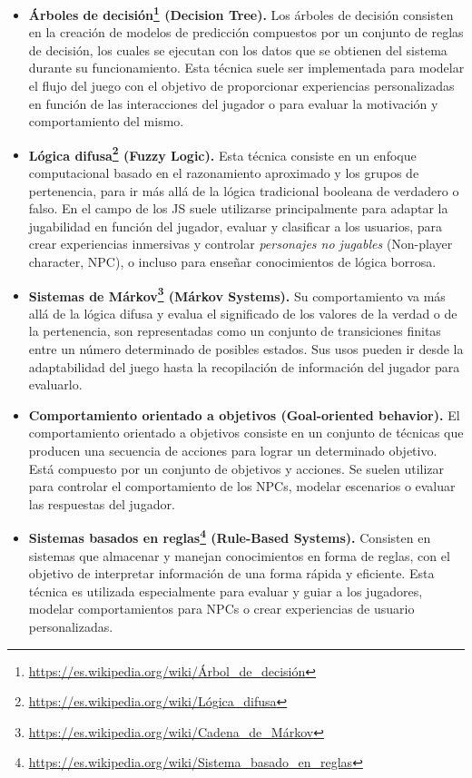 \begin{itemize}
	\item \textbf{Árboles de decisión\footnote{\url{https://es.wikipedia.org/wiki/Árbol\_de\_decisión}} (Decision Tree).} Los árboles de decisión consisten en la creación de modelos de predicción compuestos por un conjunto de reglas de decisión, los cuales se ejecutan con los datos que se obtienen del sistema durante su funcionamiento. Esta técnica suele ser implementada para modelar el flujo del juego con el objetivo de proporcionar experiencias personalizadas en función de las interacciones del jugador o para evaluar la motivación y comportamiento del mismo.
	\item \textbf{Lógica difusa\footnote{\url{https://es.wikipedia.org/wiki/Lógica\_difusa}} (Fuzzy Logic).} Esta técnica consiste en un enfoque computacional basado en el razonamiento aproximado y los grupos de pertenencia, para ir más allá de la lógica tradicional booleana de verdadero o falso. En el campo de los JS suele utilizarse principalmente para adaptar la jugabilidad en función del jugador, evaluar y clasificar a los usuarios, para crear experiencias inmersivas y controlar \emph{personajes no jugables} (Non-player character, NPC), o incluso para enseñar conocimientos de lógica borrosa.
	\item \textbf{Sistemas de Márkov\footnote{\url{https://es.wikipedia.org/wiki/Cadena\_de\_Márkov}} (Márkov Systems).} Su comportamiento va más allá de la lógica difusa y evalua el significado de los valores de la verdad o de la pertenencia, son representadas como un conjunto de transiciones finitas entre un número determinado de posibles estados. Sus usos pueden ir desde la adaptabilidad del juego hasta la recopilación de información del jugador para evaluarlo.
	\item \textbf{Comportamiento orientado a objetivos (Goal-oriented behavior).} El comportamiento orientado a objetivos consiste en un conjunto de técnicas que producen una secuencia de acciones para lograr un determinado objetivo. Está compuesto por un conjunto de objetivos y acciones. Se suelen utilizar para controlar el comportamiento de los NPCs, modelar escenarios o evaluar las respuestas del jugador.
	\item \textbf{Sistemas basados en reglas\footnote{\url{https://es.wikipedia.org/wiki/Sistema\_basado\_en\_reglas}} (Rule-Based Systems).} Consisten en sistemas que almacenar y manejan conocimientos en forma de reglas, con el objetivo de interpretar información de una forma rápida y eficiente. Esta técnica es utilizada especialmente para evaluar y guiar a los jugadores, modelar comportamientos para NPCs o crear experiencias de usuario personalizadas.

\end{itemize}
